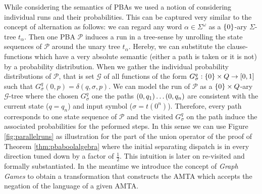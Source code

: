 While considering the semantics of \acp{PBA} we used a notion of considering 
individual runs and their probabilities. This can be captured very similar to 
the concept of alternation as follows: we can regard any word 
$\alpha\in\Sigma^{\omega}$ as a $\left\{0\right\}$-ary $\Sigma$-tree $t_{\alpha}$. Then 
one \ac{PBA} $\mathcal{P}$ induces a run in a tree-sense by unrolling the state
sequences of $\mathcal{P}$ around the unary tree $t_{\alpha}$. Hereby, we can
substitute the clause-functions which have a very absolute semantic (either a
path is taken or it is not) by a probability distribution. When we gather the
individual probability distributions of $\mathcal{P}$, that is set 
$\mathcal{G}$ of all functions of the form 
$G_{\sigma}^{q}:\left\{0\right\}\times Q\rightarrow\left[0,1\right]$ such that
$G_{\sigma}^{q}(0, p) = \delta(q,\sigma, p)$. We can model the run of 
$\mathcal{P}$ as a $\left\{0\right\}\times Q$-ary $\mathcal{G}$-tree where the chosen
$G_{\sigma}^{q}$ one the paths $\left(0,q_{1}\right)\dots\left(0,q_{n}\right)$ are 
consistent with the current state ($q = q_{n}$) and input symbol 
($\sigma = t(0^n)$). Therefore, every path corresponds to one state sequence of 
$\mathcal{P}$ and the visited $G_{\sigma}^{q}$ on the path induce the 
associated probabilities for the peformed steps. In this sense we can use 
Figure \ref{fig:parallelruns} as illustration for the part of the union 
operator of the proof of Theorem \ref{thm:pbaboolalgebra} where the initial 
separating dispatch is in every direction tuned down by a factor of 
$\frac{1}{2}$. This intuition is later on re-visited and formally 
substantiated. In the meantime we introduce the concept of \emph{Graph Games} 
to obtain a transformation that constructs the \ac{AMTA} which accepts the 
negation of the language of a given \ac{AMTA}.

